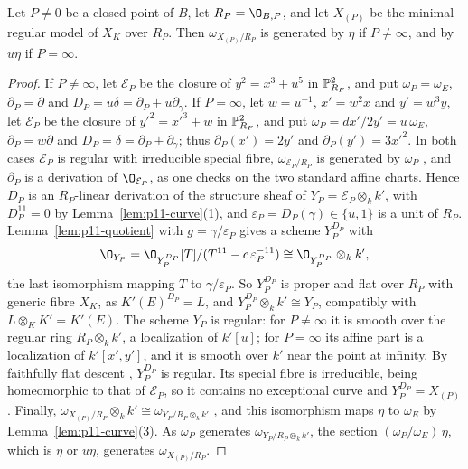 \begin{lemma}\label{lem:p11-other-fibres}
Let $P\neq 0$ be a closed point of $B$, let $R_P = \O_{B,P}$, and let $X_{(P)}$ be the minimal regular model of $X_K$ over $R_P$.
Then $\omega_{X_{(P)}/R_P}$ is generated by $\eta$ if $P\neq\infty$, and by $u\eta$ if $P = \infty$.
\end{lemma}

\begin{proof}
If $P\neq\infty$, let $\mathcal E_P$ be the closure of $y^2 = x^3+u^5$ in $\mathbb{P}^2_{R_P}$, and put $\omega_P = \omega_E$, $\partial_P = \partial$ and $D_P = u\delta = \partial_P+u\partial_\gamma$.
If $P = \infty$, let $w = u^{-1}$, $x' = w^2x$ and $y' = w^3y$, let $\mathcal E_P$ be the closure of $y'^2 = x'^3+w$ in $\mathbb{P}^2_{R_P}$, and put $\omega_P = dx'/2y' = u\,\omega_E$, $\partial_P = w\partial$ and $D_P = \delta = \partial_P+\partial_\gamma$; thus $\partial_P(x') = 2y'$ and $\partial_P(y') = 3x'^2$.
In both cases $\mathcal E_P$ is regular with irreducible special fibre, $\omega_{\mathcal E_P/R_P}$ is generated by $\omega_P$ \cite[9.1]{LLR04}, and $\partial_P$ is a derivation of $\O_{\mathcal E_P}$, as one checks on the two standard affine charts.
Hence $D_P$ is an $R_P$-linear derivation of the structure sheaf of $Y_P = \mathcal E_P\otimes_kk'$, with $D_P^{11} = 0$ by Lemma~\ref{lem:p11-curve}(1), and $\varepsilon_P = D_P(\gamma)\in\{u,1\}$ is a unit of $R_P$.
Lemma~\ref{lem:p11-quotient} with $g = \gamma/\varepsilon_P$ gives a scheme $Y_P^{D_P}$ with
\[
  \O_{Y_P} = \O_{Y_P^{D_P}}[T]/(T^{11}-c\,\varepsilon_P^{-11})\cong\O_{Y_P^{D_P}}\otimes_kk',
\]
the last isomorphism mapping $T$ to $\gamma/\varepsilon_P$.
So $Y_P^{D_P}$ is proper and flat over $R_P$ with generic fibre $X_K$, as $K'(E)^{D_P} = L$, and $Y_P^{D_P}\otimes_kk'\cong Y_P$, compatibly with $L\otimes_KK' = K'(E)$.
The scheme $Y_P$ is regular: for $P\neq\infty$ it is smooth over the regular ring $R_P\otimes_kk'$, a localization of $k'[u]$; for $P = \infty$ its affine part is a localization of $k'[x',y']$, and it is smooth over $k'$ near the point at infinity.
By faithfully flat descent \cite[Tag~]{Stacks}, $Y_P^{D_P}$ is regular.
Its special fibre is irreducible, being homeomorphic to that of $\mathcal E_P$, so it contains no exceptional curve and $Y_P^{D_P} = X_{(P)}$.
Finally, $\omega_{X_{(P)}/R_P}\otimes_kk'\cong\omega_{Y_P/R_P\otimes_kk'}$ \cite[Theorem~6.4.9]{Liu02}, and this isomorphism maps $\eta$ to $\omega_E$ by Lemma~\ref{lem:p11-curve}(3).
As $\omega_P$ generates $\omega_{Y_P/R_P\otimes_kk'}$, the section $(\omega_P/\omega_E)\,\eta$, which is $\eta$ or $u\eta$, generates $\omega_{X_{(P)}/R_P}$.
\end{proof}

